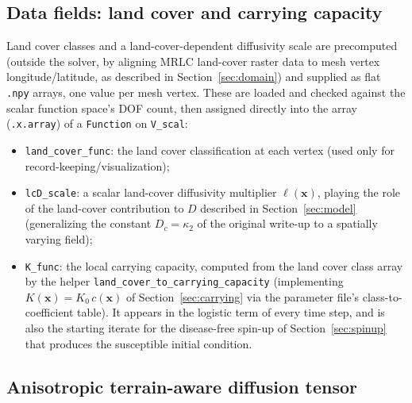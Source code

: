 \documentclass[11pt]{article}
\begin{document}
\subsection{Data fields: land cover and carrying capacity}

Land cover classes and a land-cover-dependent diffusivity scale are precomputed (outside the solver, by aligning MRLC land-cover raster data to mesh vertex longitude/latitude, as described in Section~\ref{sec:domain}) and supplied as flat \texttt{.npy} arrays, one value per mesh vertex. These are loaded and checked against the scalar function space's DOF count, then assigned directly into the array (\texttt{.x.array}) of a \texttt{Function} on \texttt{V\_scal}:
\begin{itemize}
\item \texttt{land\_cover\_func}: the land cover classification at each vertex (used only for record-keeping/visualization);
\item \texttt{lcD\_scale}: a scalar land-cover diffusivity multiplier $\ell(\mathbf{x})$, playing the role of the land-cover contribution to $D$ described in Section~\ref{sec:model} (generalizing the constant $D_c=\kappa_2$ of the original write-up to a spatially varying field);
\item \texttt{K\_func}: the local carrying capacity, computed from the land cover class array by the helper \texttt{land\_cover\_to\_carrying\_capacity} (implementing $K(\mathbf{x})=K_0\,c(\mathbf{x})$ of Section~\ref{sec:carrying} via the parameter file's class-to-coefficient table). It appears in the logistic term of every time step, and is also the starting iterate for the disease-free spin-up of Section~\ref{sec:spinup} that produces the susceptible initial condition.
\end{itemize}

\subsection{Anisotropic terrain-aware diffusion tensor}
\label{sec:impl-diffusion}
\end{document}
